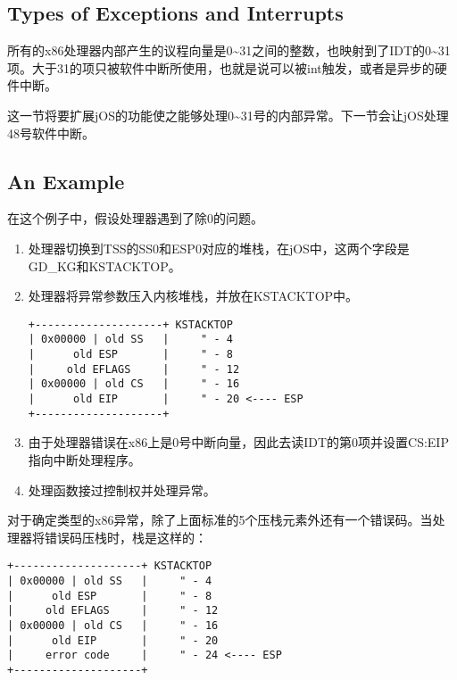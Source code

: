\subsection{Types of Exceptions and Interrupts}
\par 所有的x86处理器内部产生的议程向量是0\textasciitilde 31之间的整数，也映射到了IDT的0\textasciitilde 31项。大于31的项只被软件中断所使用，也就是说可以被int触发，或者是异步的硬件中断。
\par 这一节将要扩展jOS的功能使之能够处理0\textasciitilde 31号的内部异常。下一节会让jOS处理48号软件中断。

\subsection{An Example}
\par 在这个例子中，假设处理器遇到了除0的问题。
\begin{enumerate}
    \item 处理器切换到TSS的SS0和ESP0对应的堆栈，在jOS中，这两个字段是GD\_KG和KSTACKTOP。
    \item 处理器将异常参数压入内核堆栈，并放在KSTACKTOP中。
        \begin{lstlisting}[numbers=none]
+--------------------+ KSTACKTOP
| 0x00000 | old SS   |     " - 4
|      old ESP       |     " - 8
|     old EFLAGS     |     " - 12
| 0x00000 | old CS   |     " - 16
|      old EIP       |     " - 20 <---- ESP
+--------------------+
        \end{lstlisting}
   \item 由于处理器错误在x86上是0号中断向量，因此去读IDT的第0项并设置CS:EIP指向中断处理程序。
   \item 处理函数接过控制权并处理异常。
\end{enumerate}
\par 对于确定类型的x86异常，除了上面标准的5个压栈元素外还有一个错误码。当处理器将错误码压栈时，栈是这样的：
\begin{lstlisting}[numbers=none]
+--------------------+ KSTACKTOP
| 0x00000 | old SS   |     " - 4
|      old ESP       |     " - 8
|     old EFLAGS     |     " - 12
| 0x00000 | old CS   |     " - 16
|      old EIP       |     " - 20
|     error code     |     " - 24 <---- ESP
+--------------------+
\end{lstlisting}

